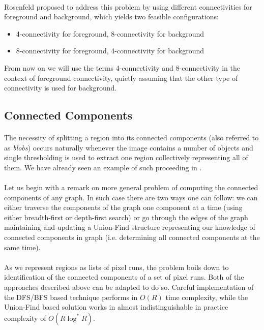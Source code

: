 \paragraph*{}
Rosenfeld proposed\cite{Rosenfeld70} to address this problem by using different connectivities for foreground and background, which yields two feasible configurations:
\begin{itemize}
	\item 4-connectivity for foreground, 8-connectivity for background
	\item 8-connectivity for foreground, 4-connectivity for background
\end{itemize}
From now on we will use the terms 4-connectivity and 8-connectivity in the context of foreground connectivity, quietly assuming that the other type of connectivity is used for background.

\subsection{Connected Components}

\paragraph*{}
The necessity of splitting a region into its connected components (also referred to as \textit{blobs}) occurs naturally whenever the image contains a number of objects and single thresholding is used to extract one region collectively representing all of them. We have already seen an example of such proceeding in . 

\paragraph*{}
Let us begin with a remark on more general problem of computing the connected components of any graph. In such case there are two ways one can follow: we can either traverse the components of the graph one component at a time (using either breadth-first or depth-first search) or go through the edges of the graph maintaining and updating a Union-Find structure representing our knowledge of connected components in graph (i.e. determining all connected components at the same time).

\paragraph*{}
As we represent regions as lists of pixel runs, the problem boils down to identification of the connected components of a set of pixel runs. Both of the approaches described above can be adapted to do so. Careful implementation of the DFS/BFS based technique performs in $O(R)$ time complexity, while the Union-Find based solution works in almost indistinguishable in practice complexity of $O(R\log^{*}R)$.

